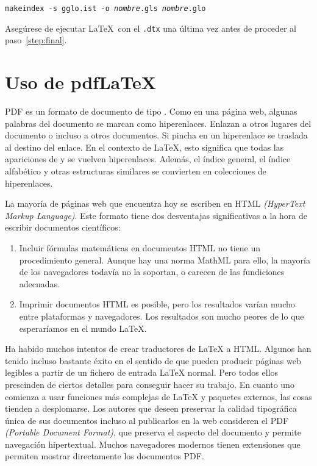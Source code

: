 \noindent\texttt{makeindex -s gglo.ist -o \textit{nombre}.gls \textit{nombre}.glo}

\noindent Asegúrese de ejecutar \LaTeX\ con el \texttt{.dtx} una
última vez antes de proceder al paso~\ref{step:final}.



\section{Uso de pdf\LaTeX} \label{sec:pdftex}
%
PDF es un formato de documento de tipo .  Como en una
página web, algunas palabras del documento se marcan como
hiperenlaces.  Enlazan a otros lugares del documento o incluso a otros
documentos.  Si pincha en un hiperenlace se traslada al destino del
enlace.  En el contexto de \LaTeX{}, esto significa que todas las
apariciones de
 y  se vuelven hiperenlaces.  Además, el índice
general, el índice alfabético y otras estructuras similares se
convierten en colecciones de hiperenlaces.

La mayoría de páginas web que encuentra hoy se escriben en HTML
  \emph{(HyperText Markup Language)}.  Este formato tiene dos
  desventajas significativas a la hora de escribir documentos
  científicos:
\begin{enumerate}
\item Incluir fórmulas matemáticas en documentos HTML no tiene un
  procedimiento general.  Aunque hay una norma MathML para ello, la
  mayoría de los navegadores todavía no la soportan, o carecen de las
  fundiciones adecuadas.  
\item Imprimir documentos HTML es posible, pero los resultados varían
  mucho entre plataformas y navegadores.  Los resultados son mucho
  peores de lo que esperaríamos en el mundo \LaTeX{}.
\end{enumerate}

Ha habido muchos intentos de crear traductores de \LaTeX{} a
HTML.  Algunos han tenido incluso bastante éxito en el sentido de que
pueden producir páginas web legibles a partir de un fichero de entrada
\LaTeX{} normal.   Pero todos ellos prescinden de ciertos detalles
para conseguir hacer su trabajo.  En cuanto uno comienza a usar
funciones más complejas de \LaTeX{} y paquetes externos, las cosas
tienden a desplomarse.  Los autores que deseen preservar la calidad
tipográfica única de sus documentos incluso al publicarlos en la web
consideren el PDF \emph{(Portable Document Format)}, que preserva el
aspecto del documento y permite navegación hipertextual.  Muchos
navegadores modernos tienen extensiones que permiten mostrar
directamente los documentos PDF.

